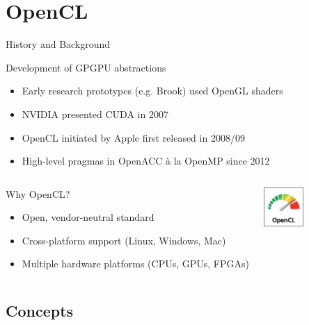\documentclass[18pt]{beamer}
\begin{document}
\section{OpenCL}

\begin{frame}{History and Background}
  \begin{block}{Development of GPGPU abstractions}
    \begin{itemize}
      \item Early research prototypes (e.g. Brook) used OpenGL shaders
      \item NVIDIA presented CUDA in 2007
      \item OpenCL initiated by Apple first released in 2008/09
      \item High-level pragmas in OpenACC à la OpenMP since 2012
    \end{itemize}
  \end{block}

  \begin{columns}[onlytextwidth]
      \begin{block}{Why OpenCL?}
        \begin{itemize}
          \item Open, vendor-neutral standard
          \item Cross-platform support (Linux, Windows, Mac)
          \item Multiple hardware platforms (CPUs, GPUs, FPGAs)
        \end{itemize}
      \end{block}

      \centering
      \includegraphics[width=1.5cm]{images/OpenCL_Logo_RGB_30mm}
  \end{columns}
\end{frame}

\subsection{Concepts}
\end{document}
